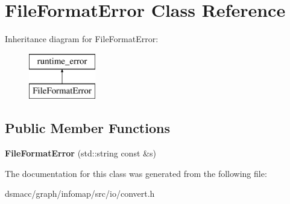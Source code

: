 \hypertarget{classFileFormatError}{}\section{File\+Format\+Error Class Reference}
\label{classFileFormatError}
Inheritance diagram for File\+Format\+Error\+:\begin{figure}[H]
\begin{center}
\leavevmode
\includegraphics[height=2.000000cm]{classFileFormatError}
\end{center}
\end{figure}
\subsection*{Public Member Functions}
\begin{DoxyCompactItemize}
\item 
\mbox{\label{classFileFormatError_a656d06e38d2270646993eadd6b1aef98}} 
{\bfseries File\+Format\+Error} (std\+::string const \&s)
\end{DoxyCompactItemize}


The documentation for this class was generated from the following file\+:\begin{DoxyCompactItemize}
\item 
dsmacc/graph/infomap/src/io/convert.\+h\end{DoxyCompactItemize}
